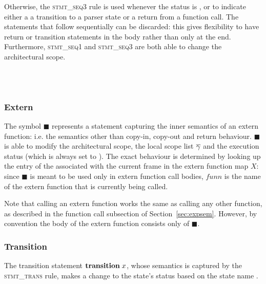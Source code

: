 \documentclass[UTF8]{article}
\begin{document}
Otherwise, the \textsc{stmt\_seq3}  rule is used whenever the status is \returnst{}, or \trans{} to indicate either a a transition to a parser state or a return from a function call. The statements that follow sequentially can be discarded: this gives flexibility to have return or transition statements in the body rather than only at the end.
Furthermore, \textsc{stmt\_seq1} and \textsc{stmt\_seq3} are both able to change the architectural scope.

\begin{figure}[h!]
    \ottusedrule{\ottdrulestmtXXseqOne{}} \\
    \ottusedrule{\ottdrulestmtXXseqTwo{}} \\
    \ottusedrule{\ottdrulestmtXXseqThree{}}
\end{figure}


\subsubsection*{Extern}
The symbol $\blacksquare$ represents a statement capturing the inner semantics of an extern function: i.e. the semantics other than copy-in, copy-out and return behaviour. $\blacksquare$ is able to modify the architectural scope, the local scope list $\overline{\gamma}$ and the execution status (which is always set to ). The exact behaviour is determined by looking up the entry of the \funn{} associated with the current frame in the extern function map $X$: since $\blacksquare$ is meant to be used only in extern function call bodies, $\mathit{funn}$ is the name of the extern function that is currently being called.

Note that calling an extern function works the same as calling any other function, as described in the function call subsection of Section~\ref{sec:expsem}. However, by convention the body of the extern function consists only of $\blacksquare$.

\begin{figure}[ht!]
    \ottusedrule{\ottdrulestmtXXext{}}
\end{figure}

\subsubsection*{Transition}
The transition statement $\mathbf{transition} \; x $, whose semantics is captured by the \textsc{stmt\_trans} rule, makes a change to the state's status \status{} based on the state name \vn{}.
\end{document}
